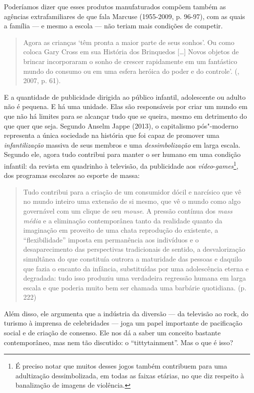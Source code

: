 Poderíamos dizer que esses produtos manufaturados compõem também as
agências extrafamiliares de que fala Marcuse (1955-2009, p. 96-97), com
as quais a família --- e mesmo a escola --- não teriam mais condições de
competir.

\begin{quote}
Agora as crianças `têm pronta a maior parte de seus sonhos'. Ou como
coloca Gary Cross em sua História dos Brinquedos [\ldots{}] Novos objetos
de brincar incorporaram o sonho de crescer rapidamente em um fantástico
mundo do consumo ou em uma esfera heróica do poder e do controle'.
(, 2007, p. 61).
\end{quote}

E a quantidade de publicidade dirigida ao público infantil, adolescente
ou adulto não é pequena. E há uma unidade. Elas são responsáveis por
criar um mundo em que não há limites para se alcançar tudo que se
queira, mesmo em detrimento do que quer que seja. Segundo Anselm Jappe
(2013), o capitalismo pós"-moderno representa a única sociedade na
história que foi capaz de promover uma \emph{infantilização} massiva de
seus membros e uma \emph{dessimbolização} em larga escala. Segundo ele,
agora tudo contribui para manter o ser humano em uma condição infantil:
da revista em quadrinho à televisão, da publicidade aos
\emph{vídeo}-\emph{games}\footnote{É preciso notar que muitos desses
  jogos também contribuem para uma adultização dessimbolizada, em todas
  as faixas etárias, no que diz respeito à banalização de imagens de
  violência.}, dos programas escolares ao esporte de massa:

\begin{quote}
Tudo contribui para a criação de um consumidor dócil e narcísico que vê
no mundo inteiro uma extensão de si mesmo, que vê o mundo como algo
governável com um clique de seu \emph{mouse}. A pressão contínua dos
\emph{mass média} e a eliminação contemporânea tanto da realidade quanto
da imaginação em proveito de uma chata reprodução do existente, a
``flexibilidade'' imposta em permanência aos indivíduos e o
desaparecimento das perspectivas tradicionais de sentido, a
desvalorização simultânea do que constituía outrora a maturidade das
pessoas e daquilo que fazia o encanto da infância, substituídas por uma
adolescência eterna e degradada: tudo isso produziu uma verdadeira
regressão humana em larga escala e que poderia muito bem ser chamada uma
barbárie quotidiana. (p. 222)
\end{quote}

Além disso, ele argumenta que a indústria da diversão --- da televisão
ao rock, do turismo à imprensa de celebridades --- joga um papel
importante de pacificação social e de criação de consenso. Ele nos dá a
saber um conceito bastante contemporâneo, mas nem tão discutido: o
``tittytainment''. Mas o que é isso?


